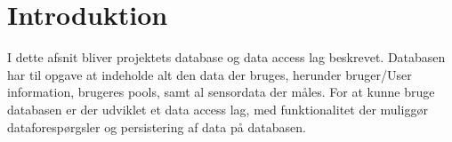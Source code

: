 \section{Introduktion}
I dette afsnit bliver projektets database og data access lag beskrevet. Databasen har til opgave at indeholde alt den data der bruges, herunder bruger/User information, brugeres pools, samt al sensordata der måles. For at kunne bruge databasen er der udviklet et data access lag, med funktionalitet der muliggør dataforespørgsler og persistering af data på databasen.

